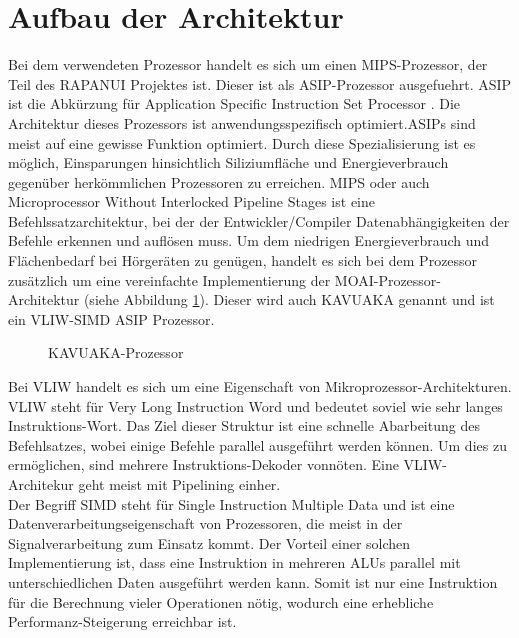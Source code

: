 \section{Aufbau der Architektur}
\label{chap:architecture_overview}
Bei dem verwendeten Prozessor handelt es sich um einen MIPS-Prozessor, der Teil des RAPANUI Projektes ist. Dieser ist als ASIP-Prozessor ausgefuehrt. ASIP ist die Abkürzung für \glqq Application Specific Instruction Set Processor \grqq. Die Architektur dieses Prozessors ist anwendungsspezifisch optimiert.ASIPs sind meist auf eine gewisse Funktion optimiert. Durch diese Spezialisierung ist es möglich, Einsparungen hinsichtlich Siliziumfläche und Energieverbrauch gegenüber herkömmlichen Prozessoren zu erreichen. MIPS oder auch \glqq Microprocessor Without Interlocked Pipeline Stages\grqq{} ist eine Befehlssatzarchitektur, bei der der Entwickler/Compiler Datenabhängigkeiten der Befehle erkennen und auflösen muss.
Um dem niedrigen Energieverbrauch und Flächenbedarf bei Hörgeräten zu genügen, handelt es sich bei dem Prozessor zusätzlich um eine vereinfachte Implementierung der MOAI-Prozessor-Architektur (siehe Abbildung \ref{fig:KAVUAKA}). Dieser wird auch KAVUAKA genannt und ist ein VLIW-SIMD ASIP Prozessor.\\
	\begin{figure}[H] 
		\centering
		
		\caption[KAVUAKA-Prozessor]{KAVUAKA-Prozessor \cite{lukasglitches2017}}
		\label{fig:KAVUAKA}
	\end{figure}
Bei VLIW  handelt es sich um eine Eigenschaft von Mikroprozessor-Architekturen. VLIW steht für \glqq Very Long Instruction Word \grqq und bedeutet soviel wie sehr langes Instruktions-Wort. Das Ziel dieser Struktur ist eine schnelle Abarbeitung des Befehlsatzes, wobei einige Befehle parallel ausgeführt werden können. Um dies zu ermöglichen, sind mehrere Instruktions-Dekoder vonnöten. Eine VLIW-Architekur geht meist mit Pipelining einher.\\
Der Begriff SIMD steht für \glqq Single Instruction Multiple Data \grqq und ist eine Datenverarbeitungseigenschaft von Prozessoren, die meist in der Signalverarbeitung zum Einsatz kommt. Der Vorteil einer solchen Implementierung ist, dass eine Instruktion in mehreren ALUs parallel mit unterschiedlichen Daten ausgeführt werden kann. Somit ist nur eine Instruktion für die Berechnung vieler Operationen nötig, wodurch eine erhebliche Performanz-Steigerung erreichbar ist.\cite[Seite 249]{wust2010mikroprozessortechnik}\\
